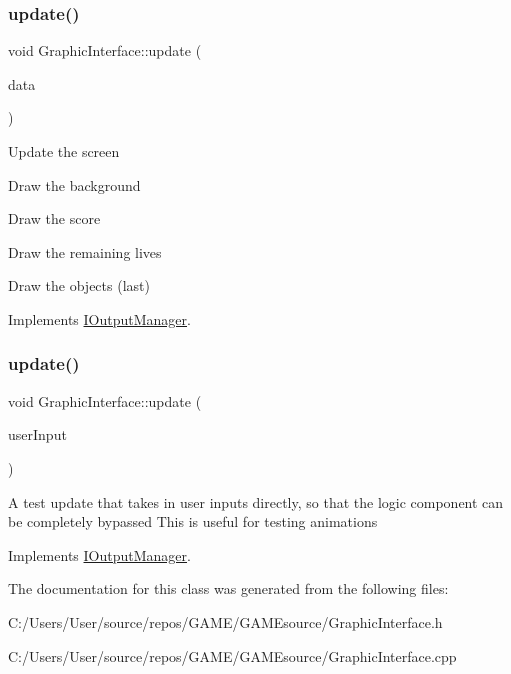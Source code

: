 \subsubsection{\texorpdfstring{update()}{update()}\hspace{0.1cm}{\footnotesize\ttfamily [1/2]}}
{\footnotesize\ttfamily void Graphic\+Interface\+::update (\begin{DoxyParamCaption}\item[{std\+::vector$<$ std\+::string $>$}]{data }\end{DoxyParamCaption})\hspace{0.3cm}{\ttfamily [virtual]}}

Update the screen
\begin{DoxyItemize}
\item Draw the background
\item Draw the score
\item Draw the remaining lives
\item Draw the objects (last) 
\end{DoxyItemize}

Implements \mbox{\hyperlink{class_i_output_manager_aaebb6c7029ac00c7ce293272a5e854e3}{I\+Output\+Manager}}.

\mbox{\label{class_graphic_interface_abb3581948def6522f616e9f3ce1c40ac}} 
\subsubsection{\texorpdfstring{update()}{update()}\hspace{0.1cm}{\footnotesize\ttfamily [2/2]}}
{\footnotesize\ttfamily void Graphic\+Interface\+::update (\begin{DoxyParamCaption}\item[{User\+Input\+Type}]{user\+Input }\end{DoxyParamCaption})\hspace{0.3cm}{\ttfamily [virtual]}}

A test update that takes in user inputs directly, so that the logic component can be completely bypassed This is useful for testing animations 

Implements \mbox{\hyperlink{class_i_output_manager_aef1aaf499f3eee5927cb2833af39ce43}{I\+Output\+Manager}}.



The documentation for this class was generated from the following files\+:\begin{DoxyCompactItemize}
\item 
C\+:/\+Users/\+User/source/repos/\+G\+A\+M\+E/\+G\+A\+M\+Esource/Graphic\+Interface.\+h\item 
C\+:/\+Users/\+User/source/repos/\+G\+A\+M\+E/\+G\+A\+M\+Esource/Graphic\+Interface.\+cpp\end{DoxyCompactItemize}
